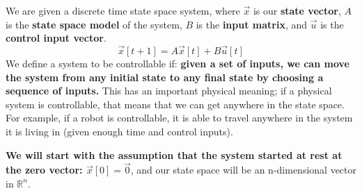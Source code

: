 

We are given a discrete time state space system, where $\vec{x}$ is our \textbf{state vector}, $A$ is the \textbf{state space model} of the system, $B$ is the \textbf{input matrix}, and $\vec{u}$ is the \textbf{control input vector}.
\begin{equation}
\vec{x}[t + 1] = A \vec{x}[t] + B\vec{u}[t]
\end{equation}
We define a system to be controllable if: \textbf{given a set of inputs, we can move the system from any initial state to any final state by choosing a sequence of inputs.} This has an important physical meaning; if a physical system is controllable, that means that we can get anywhere in the state space. For example, if a robot is controllable, it is able to travel anywhere in the system it is living in (given enough time and control inputs).

\textbf{We will start with the assumption that the system started at rest at the zero vector: $\vec{x}[0] = \vec{0}$}, and our state space will be an n-dimensional vector in $\mathbb{R}^{n}.$ 

